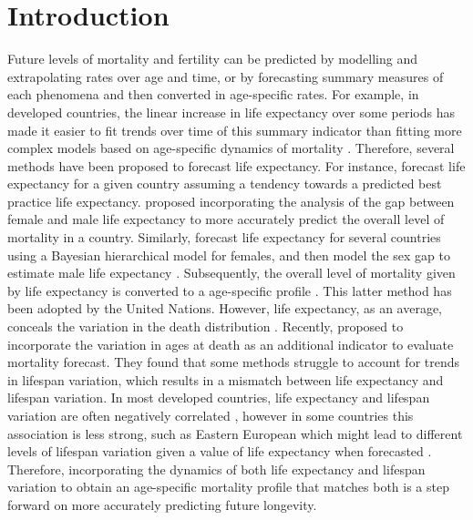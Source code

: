 \documentclass[a4paper,twoside, openright, 12pt, leqno]{article}
\begin{document}
\section{Introduction}
Future levels of mortality and fertility can be predicted by modelling and extrapolating rates over age and time, or by forecasting summary measures of each phenomena and then converted in age-specific rates. For example, in developed countries, the linear increase in life expectancy over some periods has made it easier to fit trends over time of this summary indicator than fitting more complex models based on age-specific dynamics of mortality \citep{White200259}. Therefore, several methods have been proposed to forecast life expectancy. For instance, \citet{torri2012forecasting} forecast life expectancy for a given country assuming a tendency towards a predicted best practice life expectancy. \citet{pascariu2018double} proposed incorporating the analysis of the gap between female and male life expectancy to more accurately predict the overall level of mortality in a country. Similarly, \citet{Raftery2013} forecast life expectancy for several countries using a Bayesian hierarchical model for females, and then model the sex gap to estimate male life expectancy \citep{raftery2014joint}. Subsequently, the overall level of mortality given by life expectancy is converted to a age-specific profile \citep{vsevvcikova2016age}. This latter method has been adopted by the United Nations. However, life expectancy, as an average, conceals the variation in the death distribution \citep{van2018case}. Recently, \citet{bohk2017lifespan} proposed to incorporate the variation in ages at death as an additional indicator to evaluate mortality forecast. They found that some methods struggle to account for trends in lifespan variation, which results in a mismatch between life expectancy and lifespan variation. In most developed countries, life expectancy and lifespan variation are often negatively correlated \citep{Smits2009,Vaupel2011,colchero2016emergence}, however in some countries this association is less strong, such as Eastern European which might lead to different levels of lifespan variation given a value of life expectancy when forecasted \citep{Aburto2018Eastern}. Therefore, incorporating the dynamics of both life expectancy and lifespan variation to obtain an age-specific mortality profile that matches both is a step forward on more accurately predicting future longevity.
\end{document}
